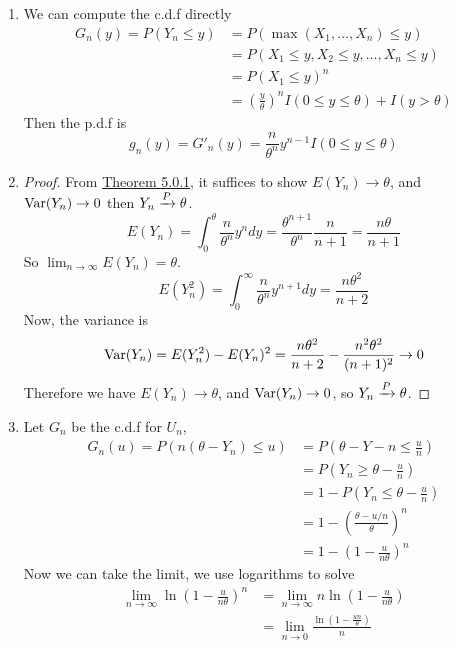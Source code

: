     \begin{enumerate}[label=(\roman*)]
        \item We can compute the c.d.f directly 
        \begin{align*}
            G_n(y) = P(Y_n \leq y) &= P(\max(X_1, \ldots, X_n) \leq y)\\
            &= P(X_1\leq y, X_2 \leq y, \ldots, X_n \leq y)\\
            &= P(X_1\leq y)^n\\
        &= \left(\frac{y}{\theta}\right)^nI(0 \leq y \leq \theta) + I(y > \theta)
    \end{align*}
    Then the p.d.f is 
    \[g_n(y) = G'_n(y) = \frac{n}{\theta^n}y^{n-1}I(0 \leq y \leq \theta)\]
    \item 
    \begin{proof}
        From \hyperref[theorem:5.0.1]{Theorem 5.0.1}, it suffices to show $E(Y_n) \rightarrow \theta$, and $\operatorname{Var}(Y_n) \rightarrow 0$ then $Y_n \xrightarrow{P} \theta$. 
        \[E(Y_n) = \int_0^\theta \frac{n}{\theta^n}y^ndy = \frac{\theta^{n+1}}{\theta^n}\frac{n}{n+1} = \frac{n\theta}{n+1}\]
        So $\lim_{n\rightarrow\infty}E(Y_n) = \theta$.
        \[E(Y_n^2) = \int_0^\infty \frac{n}{\theta^n}y^{n+1}dy  = \frac{n\theta^2}{n+2} \]
        Now, the variance is 
        \[\operatorname{Var}(Y_n) = E(Y_n^2) - E(Y_n)^2 = \frac{n\theta^2}{n+2} - \frac{n^2\theta^2}{(n+1)^2} \rightarrow 0\]
        Therefore we have $E(Y_n) \rightarrow \theta$, and $\operatorname{Var}(Y_n) \rightarrow 0$, so $Y_n \xrightarrow{P} \theta$. 
    \end{proof}
    \item Let $G_n$ be the c.d.f for $U_n$, 
    \begin{align*}
        G_n(u) = P(n(\theta-Y_n) \leq u) &= P\left(\theta - Y-n \leq \frac{u}{n}\right)\\
        &= P\left(Y_n \geq \theta - \frac{u}{n}\right)\\
        &= 1 - P\left(Y_n \leq \theta - \frac{u}{n}\right)\\
        &= 1 - \left(\frac{\theta - u/n}{\theta}\right)^n\\
        &= 1 - \left(1 - \frac{u}{n\theta}\right)^n
    \end{align*}
    Now we can take the limit, we use logarithms to solve 
    \begin{align*}
        \lim_{n\rightarrow\infty} \ln\left(1 - \frac{u}{n\theta}\right)^n &= \lim_{n\rightarrow \infty} n\ln\left(1 - \frac{u}{n\theta}\right) \\
        &= \lim_{n\rightarrow 0}\frac{\ln\left(1 - \frac{un}{\theta}\right)}{n}\tag{Change $n$ to $1/n$}\\

\end{align*}
\end{enumerate}
